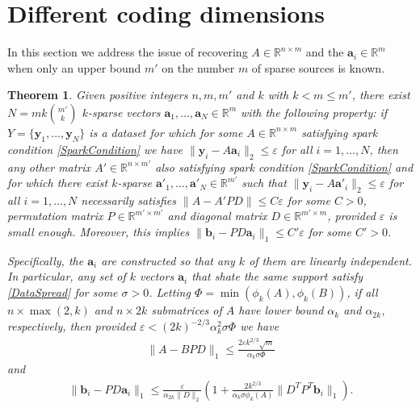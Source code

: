 \documentclass[journal, onecolumn]{IEEEtran}
\newtheorem{theorem}{Theorem}
\begin{document}

\section{Different coding dimensions}\label{mleqm}

In this section we address the issue of recovering $A \in \mathbb{R}^{n \times m}$ and the $\mathbf{a}_i \in \mathbb{R}^m$ when only an upper bound $m'$ on the number $m$ of sparse sources is known.

\begin{theorem}\label{DeterministicUniquenessTheorem2}
Given positive integers $n, m, m'$ and $k$ with $k < m \leq m'$, there exist $N =  mk{m' \choose k}$ $k$-sparse vectors $\mathbf{a}_1, \ldots, \mathbf{a}_N \in \mathbb{R}^m$ with the following property: if $Y = \{ \mathbf{y}_1, ..., \mathbf{y}_N \}$ is a dataset for which for some $A \in \mathbb{R}^{n \times m}$ satisfying spark condition \eqref{SparkCondition} we have $\| \mathbf{y}_i - A\mathbf{a}_i \|_2 \leq \varepsilon$ for all $i = 1, \ldots, N$, then any other matrix $A' \in \mathbb{R}^{n \times m'}$ also satisfying spark condition \eqref{SparkCondition} and for which there exist $k$-sparse $\mathbf{a'}_1, \ldots, \mathbf{a'}_N \in \mathbb{R}^{m'}$ such that $\| \mathbf{y}_i - A\mathbf{a'}_i \|_2 \leq \varepsilon$ for all $i = 1, \ldots, N$ necessarily satisfies $\|A - A'PD\| \leq C\varepsilon$ for some $C > 0$, permutation matrix $P \in \mathbb{R}^{m' \times m'}$ and diagonal matrix $D \in \mathbb{R}^{m' \times m}$, provided $\varepsilon$ is small enough. Moreover, this implies $\|\mathbf{b}_i - PD\mathbf{a}_i\|_1 \leq C'\varepsilon$ for some $C' > 0$.

Specifically, the $\mathbf{a}_i$ are constructed so that any $k$ of them are linearly independent. In particular, any set of $k$ vectors $\mathbf{a}_i$ that shate the same support satisfy \eqref{DataSpread} for some $\sigma > 0$. Letting $\Phi = \min(\phi_k(A), \phi_k(B))$, if all $n \times \max(2,k)$ and $n \times 2k$ submatrices of $A$ have lower bound $\alpha_k$ and $\alpha_{2k}$, respectively, then provided $\varepsilon < (2k)^{-2/3}\alpha_k^2\sigma \Phi$ we have
\begin{align}
\|A - BPD\|_1 \leq \frac{2\varepsilon k^{2/3}\sqrt{m} }{\alpha_k\sigma \Phi}
\end{align}
%
and 
\begin{align}\label{b_PDa}
\|\mathbf{b}_i - PD\mathbf{a}_i\|_1 \leq \frac{\varepsilon}{\alpha_{2k}\|D\|_2}  \left( 1 + \frac{2 k^{2/3}}{\alpha_k\sigma \phi_k(A)}\|D^TP^T\mathbf{b}_i\|_1 \right).
\end{align}
\end{theorem}
\end{document}
